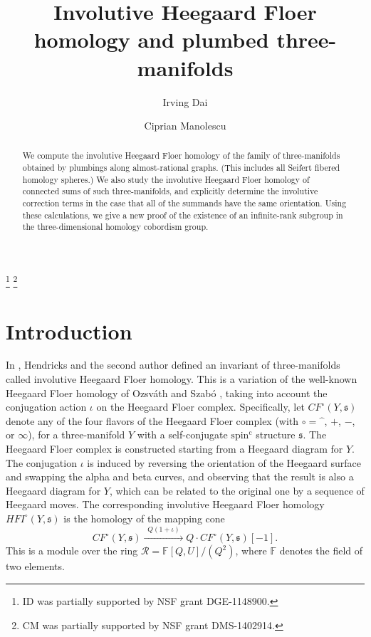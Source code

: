 \documentclass[11 pt]{amsart}
\theoremstyle{remark}
\def\spinc {{\operatorname{spin^c}}}
\def\s{\mathfrak s}
\def\Ring {\mathcal R}
\def\ff {{\mathbb{F}}}
\def\ccdot {\! \cdot \!}
\def\CF {\mathit{CF}}
\newcommand \CFo {\CF^{\circ}}
\def\HFI {\mathit{HFI}}
\newcommand \HFIo {\HFI^{\circ}}
\def\inv{\iota}
\begin{document}
\title{Involutive Heegaard Floer homology and plumbed three-manifolds}

\author[Irving Dai]{Irving Dai}
\author[Ciprian Manolescu]{Ciprian Manolescu}
\thanks{ID was partially supported by NSF grant DGE-1148900.}
\thanks {CM was partially supported by NSF grant DMS-1402914.}


\address{Department of Mathematics, Princeton University, Princeton, NJ 08540}

\address {Department of Mathematics, UCLA, 
Los Angeles, CA 90095}

\begin{abstract}
We compute the involutive Heegaard Floer homology of the family of three-manifolds obtained by plumbings along almost-rational graphs. (This includes all Seifert fibered homology spheres.) We also study the involutive Heegaard Floer homology of connected sums of such three-manifolds, and explicitly determine the involutive correction terms in the case that all of the summands have the same orientation. Using these calculations, we give a new proof of the existence of an infinite-rank subgroup in the three-dimensional homology cobordism group. 
\end{abstract}



\maketitle


\section{Introduction}
\label{sec:introduction}
In \cite{HMinvolutive}, Hendricks and the second author defined an invariant of three-manifolds called involutive Heegaard Floer homology. This is a variation of the well-known Heegaard Floer homology of Ozsv\'ath and Szab\'o \cite{HolDisk, HolDiskTwo}, taking into account the conjugation action $\inv$ on the Heegaard Floer complex. Specifically, let $\CFo(Y, \s)$ denote any of the four flavors of the Heegaard Floer complex (with $\circ = \widehat{\phantom{a}}$, $+$, $-$, or $\infty$), for a three-manifold $Y$ with a self-conjugate $\spinc$ structure $\s$. The Heegaard Floer complex is   constructed starting from a Heegaard diagram for $Y$. The conjugation $\iota$ is induced by reversing the orientation of the Heegaard surface and swapping the alpha and beta curves, and observing that the result is also a Heegaard diagram for $Y$, which can be related to the original one by a sequence of Heegaard moves. The corresponding involutive Heegaard Floer homology $\HFIo(Y, \s)$ is the homology of the mapping cone
\begin{equation}
\label{eq:CFI}
\CFo(Y, \s) \xrightarrow{\phantom{o} Q (1+\inv) \phantom{o}} Q \ccdot \CFo(Y, \s) [-1]. 
\end{equation}
This is a module over the ring $\Ring = \ff[Q, U]/(Q^2)$, where $\ff$ denotes the field of two elements.
\end{document}
